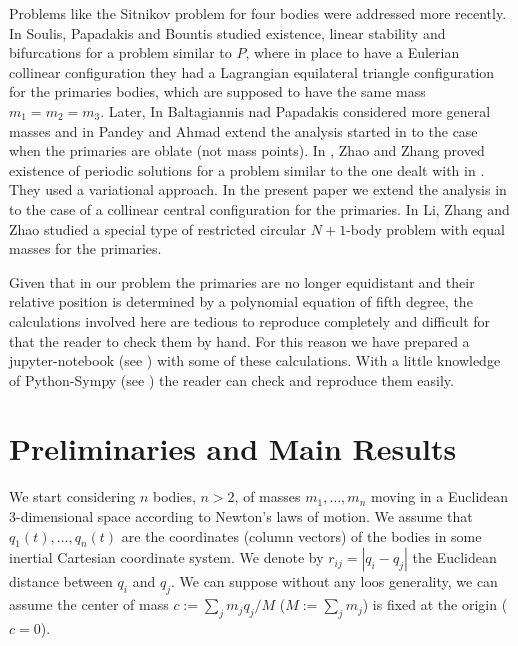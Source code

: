 \documentclass[twoside]{article}
\theoremstyle{remark}
\begin{document}
Problems like the Sitnikov problem for four bodies  were addressed more recently.
In \cite{soulis2008periodic} Soulis, Papadakis and Bountis studied existence, linear stability and bifurcations for a problem similar to $P$, where in place to have a Eulerian collinear configuration they had a Lagrangian equilateral triangle configuration for the primaries bodies, which are supposed to have the same mass $m_1=m_2=m_3$. Later, In \cite{baltagiannis2011families} Baltagiannis nad Papadakis considered more general masses and in \cite{pandey2013periodic} Pandey and Ahmad extend the analysis started in \cite{soulis2008periodic} to the case when the primaries are oblate (not mass points).
In \cite{zhao2015nonplanar}, Zhao and Zhang proved existence of periodic solutions for a problem similar to the one dealt with in \cite{soulis2008periodic}.  They used a variational approach. In the present paper we extend the analysis in \cite{zhao2015nonplanar} to the case of a collinear central configuration for the primaries.
In \cite{li2013characterization} Li, Zhang and Zhao studied a special type of
restricted circular $N+1$-body problem  with equal masses for the primaries. 

Given that in our problem the primaries are no longer equidistant and their relative 
position is determined by a polynomial equation of fifth degree, the calculations involved 
here are tedious to reproduce completely and difficult for that the reader to check them 
by hand. For this reason we have prepared a jupyter-notebook (see \cite{CalAux}) with some 
of these calculations. With a little knowledge of Python-Sympy (see \cite{sympy}) the reader 
can check and reproduce them easily.


\section{Preliminaries and Main Results}

We start considering $n$ bodies, $n>2$, of masses $m_1,\ldots,m_n$ moving in a Euclidean 3-dimensional space according to Newton's laws of motion. We assume that $q_1(t),\ldots,q_n(t)$ are the coordinates (column vectors) of the bodies in some inertial Cartesian coordinate system. We denote by $r_{ij}=|q_i-q_j|$  the  Euclidean distance between $q_i$ and $q_j$. We can suppose without any loos generality, we can assume the center of mass   $c:=\sum_jm_jq_j/M$ ($M:=\sum_j m_j$) is fixed at the origin ($c=0$).
\end{document}
